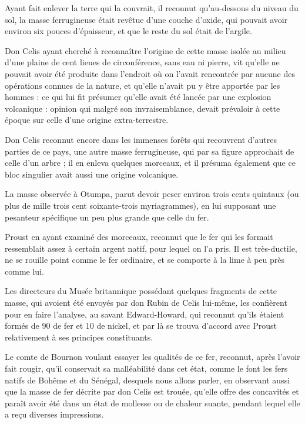 \documentclass[a4paper, 12pt, oneside, french]{article}
\begin{document}
Ayant fait enlever la terre qui la couvrait, il reconnut qu'au-dessous du niveau du sol, la masse ferrugineuse était revêtue d'une couche d'oxide, qui pouvait avoir environ six pouces d'épaisseur, et que le reste du sol était de l'argile.

Don Celis ayant cherché à reconnaître l'origine de cette masse isolée au milieu d'une plaine de cent lieues de circonférence, sans eau ni pierre, vit qu'elle ne pouvait avoir été produite dans l'endroit où on l'avait rencontrée par aucune des opérations connues de la nature, et qu'elle n'avait pu y être apportée par les hommes : ce qui lui fit présumer qu'elle avait été lancée par une explosion volcanique : opinion qui malgré son invraisemblance, devait prévaloir à cette époque sur celle d'une origine extra-terrestre.

Don Celis reconnut encore dans les immenses forêts qui recouvrent d'autres parties de ce pays, une autre masse ferrugineuse, qui par sa figure approchait de celle d'un arbre ; il en enleva quelques morceaux, et il présuma également que ce bloc singulier avait aussi une origine volcanique.

La masse observée à Otumpa, parut devoir peser environ trois cents quintaux (ou plus de mille trois cent soixante-trois myriagrammes), en lui supposant une pesanteur spécifique un peu plus grande que celle du fer.

Proust en ayant examiné des morceaux, reconnut que le fer qui les formait ressemblait assez à certain argent natif, pour lequel on l'a pris. Il est très-ductile, ne se rouille point comme le fer ordinaire, et se comporte à la lime à peu près comme lui.

Les directeurs du Musée britannique possédant quelques fragments de cette masse, qui avoient été envoyés par don Rubin de Celis lui-même, les confièrent pour en faire l'analyse, au savant Edward-Howard, qui reconnut qu'ils étaient formés de 90 de fer et 10 de nickel, et par là se trouva d'accord avec Proust relativement à ses principes constituants.

Le comte de Bournon voulant essayer les qualités de ce fer, reconnut, après l'avoir fait rougir, qu'il conservait sa malléabilité dans cet état, comme le font les fers natifs de Bohême et du Sénégal, desquels nous allons parler, en observant aussi que la masse de fer décrite par don Celis est trouée, qu'elle offre des concavités et paraît avoir été dans un état de mollesse ou de chaleur suante, pendant lequel elle a reçu diverses impressions.
\end{document}
